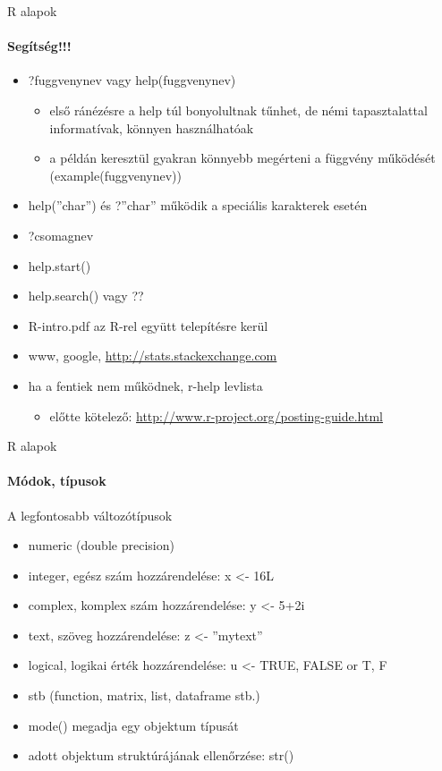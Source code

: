 \documentclass[10pt]{beamer}
\begin{document}
\begin{frame}{R alapok}
\framesubtitle{Segítség!!!}
\begin{itemize}
\item ?fuggvenynev vagy help(fuggvenynev)
\begin{itemize}
\item első ránézésre a help túl bonyolultnak tűnhet, de némi tapasztalattal informatívak, könnyen használhatóak
\item a példán keresztül gyakran könnyebb megérteni a függvény működését (example(fuggvenynev))
\end{itemize}
\item help(''char'') és ?''char'' működik a speciális karakterek esetén
\item ?csomagnev
\item help.start()
\item help.search() vagy ??
\item R-intro.pdf az R-rel együtt telepítésre kerül
\item www, google, \textcolor{blue}{\url{http://stats.stackexchange.com}}
\item ha a fentiek nem működnek, r-help levlista
\begin{itemize}
\item előtte kötelező: \textcolor{blue}{\url{http://www.r-project.org/posting-guide.html}}
\end{itemize}
\end{itemize}
\end{frame}

\begin{frame}{R alapok}
\framesubtitle{Módok, típusok}
A legfontosabb változótípusok
\begin{itemize}
\item numeric (double precision)
\item integer, egész szám hozzárendelése: x <- 16L
\item complex, komplex szám hozzárendelése: y <- 5+2i
\item text, szöveg hozzárendelése: z <- ''mytext''
\item logical, logikai érték hozzárendelése: u <- TRUE, FALSE or T, F
\item stb (function, matrix, list, dataframe stb.)
\item mode() megadja egy objektum típusát
\item adott objektum struktúrájának ellenőrzése: str()
\end{itemize}
\end{frame}
\end{document}

